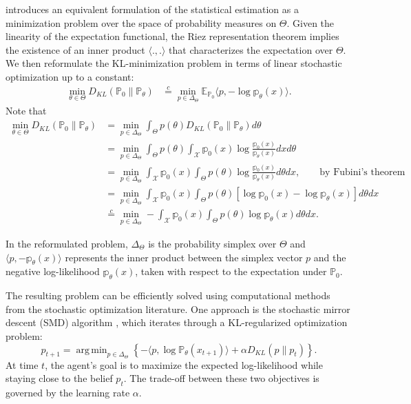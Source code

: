 \documentclass[twoside,11pt]{article}
\numberwithin{equation}{section}
\newcommand{\E}{\mathbb{E}}
\newcommand\bP{\mathbb{P}}
\newcommand\bp{\mathbb{p}}
\DeclareMathOperator*{\argmin}{arg\,min}
\begin{document}
 introduces an equivalent formulation of the statistical estimation as a minimization problem over the space of probability measures on $\Theta$. Given the linearity of the expectation functional, the Riez representation theorem implies the existence of an inner product $\langle., .\rangle$ that characterizes the expectation over $\Theta$. We then reformulate the KL-minimization problem in terms of linear stochastic optimization up to a constant:
\begin{equation}
    \begin{aligned}
   \min_{\theta \in \Theta} D_{KL}(\bP_0\parallel \bP_\theta)  &\overset{c}{=}  \min_{p \in \Delta_\Theta}  \E_{\bP_0}\langle p,- \log \bp_\theta(x) \rangle.  
    \end{aligned}
\end{equation}
Note that
\begin{align*}
      \min_{\theta \in \Theta} D_{KL}(\bP_0\parallel \bP_\theta) &= \min_{p \in \Delta_\Theta} \int_\Theta p(\theta) D_{KL}(\bP_0\parallel \bP_\theta) d \theta  \\
      &= \min_{p \in \Delta_\Theta} \int_\Theta p(\theta) \int_{\mathcal X} \bp_0(x) \log \frac{\bp_0(x)}{\bp_\theta(x)} dx d \theta \\
      & = \min_{p \in \Delta_\Theta} \int_{\mathcal X} \bp_0(x) \int_\Theta p(\theta) \log \frac{\bp_0(x)}{\bp_\theta(x)} d \theta dx, \qquad \text{by Fubini's theorem} \\
      &= \min_{p \in \Delta_\Theta} \int_{\mathcal X} \bp_0(x) \int_\Theta p(\theta) [\log \bp_0(x) - \log \bp_\theta(x) ] d \theta dx \\
      &\overset{c}{=}  \min_{p \in \Delta_\Theta} - \int_{\mathcal X} \bp_0(x) \int_\Theta p(\theta) \log \bp_\theta(x)  d \theta dx. 
\end{align*}

In the reformulated problem, $\Delta_\Theta$ is the probability simplex over $\Theta$ and $\langle p,- \bp_\theta(x) \rangle$ represents the inner product between the simplex vector $p$ and the negative log-likelihood $\bp_\theta(x)$, taken with respect to the expectation under $\bP_0$.

The resulting problem can be efficiently solved using computational methods from the stochastic optimization literature. One approach is the stochastic mirror descent (SMD) algorithm \cite[Algorithm~6]{Uribe2022-1, Uribe2022-2}, which iterates through a KL-regularized optimization problem:
\begin{equation}
\label{eqn:smd}
    p_{t+1} = \argmin_{p \in \Delta_\Theta} \left\{-\langle p,  \log \bP_\theta(x_{t+1})\rangle + \alpha D_{KL}(p \parallel p_t) \right\}. 
\end{equation}
At time $t$, the agent’s goal is to maximize the expected log-likelihood while staying close to the belief $p_t$. The trade-off between these two objectives is governed by the learning rate $\alpha$.
\end{document}
